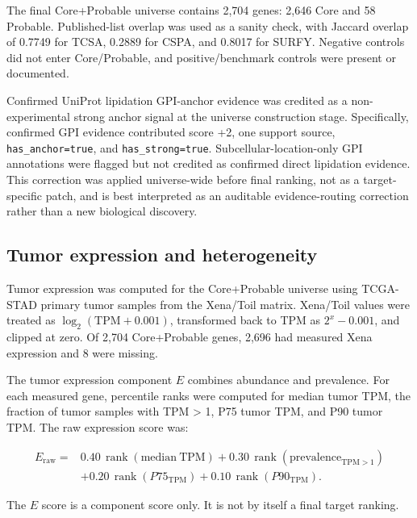 \documentclass[twocolumn]{article}
\begin{document}
The final Core+\allowbreak{}Probable universe contains 2,704 genes: 2,646 Core and 58 Probable. Published-list overlap was used as a sanity check, with Jaccard overlap of 0.7749 for TCSA, 0.2889 for CSPA, and 0.8017 for SURFY. Negative controls did not enter Core/\allowbreak{}Probable, and positive/\allowbreak{}benchmark controls were present or documented.

Confirmed UniProt lipidation GPI-anchor evidence was credited as a non-experimental strong anchor signal at the universe construction stage. Specifically, confirmed GPI evidence contributed score +\allowbreak{}2, one support source, \texttt{has\_anchor=true}, and \texttt{has\_strong=true}. Subcellular-location-only GPI annotations were flagged but not credited as confirmed direct lipidation evidence. This correction was applied universe-wide before final ranking, not as a target-specific patch, and is best interpreted as an auditable evidence-routing correction rather than a new biological discovery.

\subsection{Tumor expression and heterogeneity}

Tumor expression was computed for the Core+\allowbreak{}Probable universe using TCGA-STAD primary tumor samples from the Xena/\allowbreak{}Toil matrix. Xena/\allowbreak{}Toil values were treated as $\log_2(\mathrm{TPM}+0.001)$, transformed back to TPM as $2^{x} - 0.001$, and clipped at zero. Of 2,704 Core+\allowbreak{}Probable genes, 2,696 had measured Xena expression and 8 were missing.

The tumor expression component $E$ combines abundance and prevalence. For each measured gene, percentile ranks were computed for median tumor TPM, the fraction of tumor samples with TPM > 1, P75 tumor TPM, and P90 tumor TPM. The raw expression score was:

\begin{equation}
\begin{split}
E_{\mathrm{raw}} ={}& 0.40\,\operatorname{rank}(\mathrm{median\ TPM})
 + 0.30\,\operatorname{rank}(\mathrm{prevalence}_{\mathrm{TPM}>1}) \\
& + 0.20\,\operatorname{rank}(P75_{\mathrm{TPM}})
 + 0.10\,\operatorname{rank}(P90_{\mathrm{TPM}}).
\end{split}
\end{equation}

The $E$ score is a component score only. It is not by itself a final target ranking.
\end{document}
